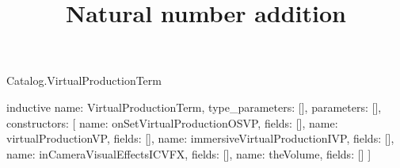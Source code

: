 \begin{lexlean}{Catalog.VirtualProductionTerm}
\title{Natural number addition}
\begin{semanticmodule}
inductive{
  name: VirtualProductionTerm,
  type_parameters: [],
  parameters: [],
  constructors: [
    {name: onSetVirtualProductionOSVP, fields: []},
    {name: virtualProductionVP, fields: []},
    {name: immersiveVirtualProductionIVP, fields: []},
    {name: inCameraVisualEffectsICVFX, fields: []},
    {name: theVolume, fields: []}
  ]
}
\end{semanticmodule}
\end{lexlean}
